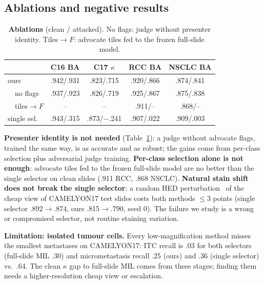 \documentclass[10pt,twocolumn]{article}
\begin{document}
\subsection{Ablations and negative results}
\begin{table}[t]\centering
\caption{\textbf{Ablations} (clean / attacked). No flags: judge without presenter identity. Tiles$\to F$: advocate tiles fed to the frozen full-slide model.}\label{tab:abl}
\setlength{\tabcolsep}{2.5pt}
\begin{tabular}{@{}lcccc@{}}\toprule
 & C16 BA & C17 $\kappa$ & RCC BA & NSCLC BA\\\midrule
ours & .942/.931 & .823/.715 & .920/.866 & .874/.841\\
\ \ no flags & .937/.923 & .826/.719 & .925/.867 & .875/.838\\
\ \ tiles$\to F$ & -- & -- & .911/-- & .868/--\\
single sel. & .943/.315 & .873/$-$.241 & .907/.022 & .909/.003\\\bottomrule
\end{tabular}\end{table}
\textbf{Presenter identity is not needed} (Table~\ref{tab:abl}): a judge without advocate flags, trained the same way, is as accurate and as robust; the gains come from per-class selection plus adversarial judge training. \textbf{Per-class selection alone is not enough}: advocate tiles fed to the frozen full-slide model are no better than the single selector on clean slides (.911 RCC, .868 NSCLC). \textbf{Natural stain shift does not break the single selector}: a random HED perturbation~\cite{tellez2019stain} of the cheap view of CAMELYON17 test slides costs both methods $\le$3 points (single selector .892$\to$.874, ours .815$\to$.790, seed 0). The failure we study is a wrong or compromised selector, not routine staining variation.

\textbf{Limitation: isolated tumour cells.} Every low-magnification method misses the smallest metastases on CAMELYON17: ITC recall is .03 for both selectors (full-slide MIL .30) and micrometastasis recall .25 (ours) and .36 (single selector) vs.\ .64. The clean $\kappa$ gap to full-slide MIL comes from these stages; finding them needs a higher-resolution cheap view or escalation.

\end{document}
